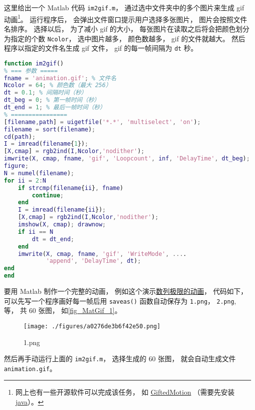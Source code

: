 

这里给出一个 Matlab 代码 \verb`im2gif.m`， 通过选中文件夹中的多个图片来生成 gif 动画\footnote{网上也有一些开源软件可以完成该任务， 如 \href{http://www.onyxbits.de/giftedmotion}{GiftedMotion} （需要先安装 \href{https://www.java.com/download/ie_manual.jsp}{java}）。}。 运行程序后， 会弹出文件窗口提示用户选择多张图片， 图片会按照文件名排序。 选择以后， 为了减小 gif 的大小， 每张图片在读取之后将会把颜色划分为指定的个数 \verb`Ncolor`， 选中图片越多， 颜色数越多， gif 的文件就越大。 然后程序以指定的文件名生成 gif 文件， gif 的每一帧间隔为 \verb`dt` 秒。

\begin{lstlisting}[language=matlab, caption=im2gif.m]
function im2gif()
% === 参数 =====
fname = 'animation.gif'; % 文件名
Ncolor = 64; % 颜色数（最大 256）
dt = 0.1; % 间隔时间（秒）
dt_beg = 0; % 第一帧时间（秒）
dt_end = 1; % 最后一帧时间（秒）
% ================
[filename,path] = uigetfile('*.*', 'multiselect', 'on');
filename = sort(filename);
cd(path);
I = imread(filename{1});
[X,cmap] = rgb2ind(I,Ncolor,'nodither');
imwrite(X, cmap, fname, 'gif', 'Loopcount', inf, 'DelayTime', dt_beg);
figure;
N = numel(filename);
for ii = 2:N
    if strcmp(filename{ii}, fname)
        continue;
    end
    I = imread(filename{ii});
    [X,cmap] = rgb2ind(I,Ncolor,'nodither');
    imshow(X, cmap); drawnow;
    if ii == N
        dt = dt_end;
    end
    imwrite(X, cmap, fname, 'gif', 'WriteMode', ....
            'append', 'DelayTime', dt);
end
end
\end{lstlisting}

要用 Matlab 制作一个完整的动画， 例如这个演示\href{https://wuli.wiki/apps/Lim0.html}{数列极限的动画}， 代码如下， 可以先写一个程序画好每一帧后用 \verb`saveas()` 函数自动保存为 \verb`1.png`， \verb`2.png`, 等， 共 60 张图， 如\autoref{fig_MatGif_1}。
\begin{figure}[ht]
\centering
\texttt{[image: ./figures/a0276de3b6f42e50.png]}
\caption{1.png} \label{fig_MatGif_1}
\end{figure}
然后再手动运行上面的 \verb`im2gif.m`， 选择生成的 60 张图， 就会自动生成文件 \verb`animation.gif`。

